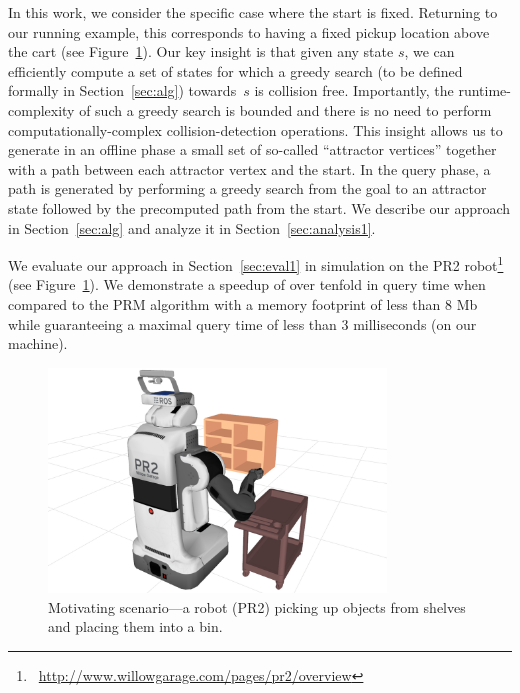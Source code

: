 \documentclass[a4paper]{report}
\begin{document}
In this work, we consider the specific case where the start is fixed. Returning to our running example, this corresponds to having a fixed pickup location above the cart (see Figure~\ref{fig:PR2}).
%
Our key insight is that given any state $s$, we can efficiently compute a set of states for which a greedy search (to be defined formally in Section~\ref{sec:alg}) towards~$s$ is collision free.
Importantly, the runtime-complexity of such a greedy search is bounded and there is no need to perform computationally-complex collision-detection operations. 
This insight allows us to generate in an offline phase a small set of so-called ``attractor vertices'' together with a path between each attractor vertex and the start.
In the query phase, a path is generated by performing a greedy search from the goal to an attractor state followed by the precomputed path from the start.
We describe our approach in Section~\ref{sec:alg} and analyze it in Section~\ref{sec:analysis1}.


We evaluate our approach in Section~\ref{sec:eval1} in simulation on the PR2 robot\footnote{~\url{http://www.willowgarage.com/pages/pr2/overview}} (see Figure~\ref{fig:PR2}).
We demonstrate a speedup of over tenfold in query time when compared to the PRM algorithm with a memory footprint of less than 8 Mb while guaranteeing a maximal query time of less than 3 milliseconds (on our machine).


\begin{figure}[tb]
  \centering
     \includegraphics[width=0.8\textwidth]{pr2.png}
  \caption{
  Motivating scenario---a robot (PR2) picking up objects from shelves and placing them into a bin.
}
    \label{fig:PR2}
\end{figure}
\end{document}
